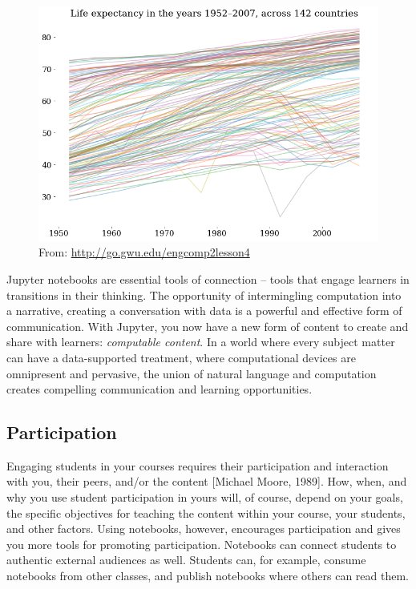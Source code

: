 \documentclass[]{book}
\begin{document}
\begin{figure}
\centering
\includegraphics{images/engcomp2lesson4-life-expectancy.png}
\caption{From: \url{http://go.gwu.edu/engcomp2lesson4}}
\end{figure}

Jupyter notebooks are essential tools of connection -- tools that engage
learners in transitions in their thinking. The opportunity of
intermingling computation into a narrative, creating a conversation with
data is a powerful and effective form of communication. With Jupyter,
you now have a new form of content to create and share with learners:
\emph{computable content}. In a world where every subject matter can
have a data-supported treatment, where computational devices are
omnipresent and pervasive, the union of natural language and computation
creates compelling communication and learning opportunities.

\subsection{Participation}\label{participation}

Engaging students in your courses requires their participation and
interaction with you, their peers, and/or the content {[}Michael Moore,
1989{]}. How, when, and why you use student participation in yours will,
of course, depend on your goals, the specific objectives for teaching
the content within your course, your students, and other factors. Using
notebooks, however, encourages participation and gives you more tools
for promoting participation. Notebooks can connect students to authentic
external audiences as well. Students can, for example, consume notebooks
from other classes, and publish notebooks where others can read them.
\end{document}
